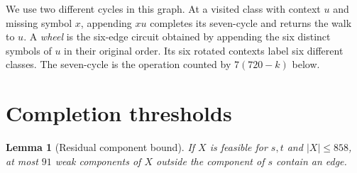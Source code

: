 \documentclass[11pt]{article}
\newtheorem{lemma}[theorem]{Lemma}
\begin{document}
We use two different cycles in this graph. At a visited class with context $u$ and missing symbol $x$, appending $xu$ completes its seven-cycle and returns the walk to $u$. A \emph{wheel} is the six-edge
circuit obtained by appending the six distinct symbols of $u$ in their
original order. Its six rotated contexts label six different classes.
The seven-cycle is the operation counted by $7(720-k)$ below.

\section{Completion thresholds}
\label{sec:thresholds}

\begin{lemma}[Residual component bound]\label{lem:sevencap}
If $X$ is feasible for $s,t$ and $|X|\le858$, at most $91$ weak
components of $X$ outside the component of $s$ contain an edge.
\end{lemma}
\end{document}
